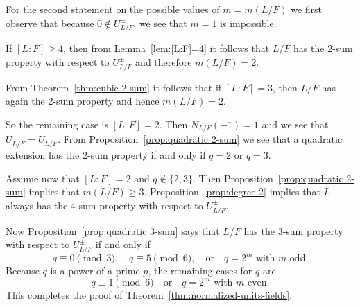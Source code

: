 \documentclass[11pt, a4paper]{amsart}
\theoremstyle{definition}
\numberwithin{equation}{section}
\begin{document}
For the second statement on the possible values of $m=m(L/F)$ we first observe that because $0\notin U_{L/F}^{\pm}$, we see that $m=1$ is impossible.

If $[L:F]\geq 4$, then from Lemma~\ref{lem:[L:F]=4} it follows that $L/F$ has the $2$-sum property with respect to $U_{L/F}^{\pm}$ and therefore \( m(L/F)=2.\) 

From Theorem~\ref{thm:cubic 2-sum} it follows that if $[L:F]=3$, then $L/F$ has again the $2$-sum property and hence $m(L/F)=2$.

So the remaining case is $[L:F]=2$. Then $N_{L/F}(-1)=1$ and we see that \( U_{L/F}^{\pm}=U_{L/F}. \)
From Proposition~\ref{prop:quadratic 2-sum} we see that a quadratic extension has the $2$-sum property if and only if $q=2$ or $q=3$.

Assume now that $[L:F]=2$ and $q\not\in\{ 2,3\}$. Then Proposition~\ref{prop:quadratic 2-sum} implies
that \(m(L/F)\geq 3. \)
Proposition~\ref{prop:degree-2} implies that $L$ always has the $4$-sum property  with respect to
$U_{L/F}^{\pm}$.

Now Proposition~\ref{prop:quadratic 3-sum} says that $L/F$ has the $3$-sum property with respect to
$U_{L/F}^{\pm}$ if and only if
\[
q\equiv 0 \pmod 3,\quad q\equiv 5 \pmod 6,
\quad \text{or}\quad q=2^m \text{ with } m \text{ odd}.
\]
Because $q$ is a power of a prime $p$, the remaining cases for $q$ are
\[
q\equiv 1 \pmod 6
\quad \text{or}\quad
q=2^m \text{ with } m \text{ even}.
\]
This completes the proof of Theorem~\ref{thm:normalized-units-fields}.



\end{document}
